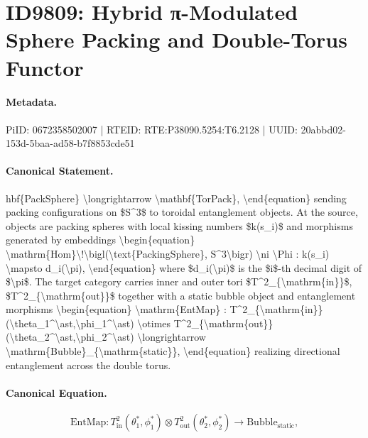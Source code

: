 \section*{ID9809: Hybrid π-Modulated Sphere Packing and Double-Torus Functor}
\paragraph{Metadata.}
PiID: 0672358502007 | RTEID: RTE:P38090.5254:T6.2128 | UUID: 20abbd02-153d-5baa-ad58-b7f8853cde51

\paragraph{Canonical Statement.}
hbf\{PackSphere\} \textbackslash{}longrightarrow \textbackslash{}mathbf\{TorPack\}, \textbackslash{}end\{equation\} sending packing configurations on \$S\textasciicircum{}3\$ to toroidal entanglement objects. At the source, objects are packing spheres with local kissing numbers \$k(s\_i)\$ and morphisms generated by embeddings \textbackslash{}begin\{equation\} \textbackslash{}mathrm\{Hom\}\textbackslash{}!\textbackslash{}bigl(\textbackslash{}text\{PackingSphere\}, S\textasciicircum{}3\textbackslash{}bigr) \textbackslash{}ni \textbackslash{}Phi : k(s\_i) \textbackslash{}mapsto d\_i(\textbackslash{}pi), \textbackslash{}end\{equation\} where \$d\_i(\textbackslash{}pi)\$ is the \$i\$-th decimal digit of \$\textbackslash{}pi\$. The target category carries inner and outer tori \$T\textasciicircum{}2\_\{\textbackslash{}mathrm\{in\}\}\$, \$T\textasciicircum{}2\_\{\textbackslash{}mathrm\{out\}\}\$ together with a static bubble object and entanglement morphisms \textbackslash{}begin\{equation\} \textbackslash{}mathrm\{EntMap\} : T\textasciicircum{}2\_\{\textbackslash{}mathrm\{in\}\}(\textbackslash{}theta\_1\textasciicircum{}\textbackslash{}ast,\textbackslash{}phi\_1\textasciicircum{}\textbackslash{}ast) \textbackslash{}otimes T\textasciicircum{}2\_\{\textbackslash{}mathrm\{out\}\}(\textbackslash{}theta\_2\textasciicircum{}\textbackslash{}ast,\textbackslash{}phi\_2\textasciicircum{}\textbackslash{}ast) \textbackslash{}longrightarrow \textbackslash{}mathrm\{Bubble\}\_\{\textbackslash{}mathrm\{static\}\}, \textbackslash{}end\{equation\} realizing directional entanglement across the double torus.

\paragraph{Canonical Equation.}
\[
\mathrm{EntMap} : T^2_{\mathrm{in}}(\theta_1^\ast,\phi_1^\ast) \otimes T^2_{\mathrm{out}}(\theta_2^\ast,\phi_2^\ast) \longrightarrow \mathrm{Bubble}_{\mathrm{static}},
\]

